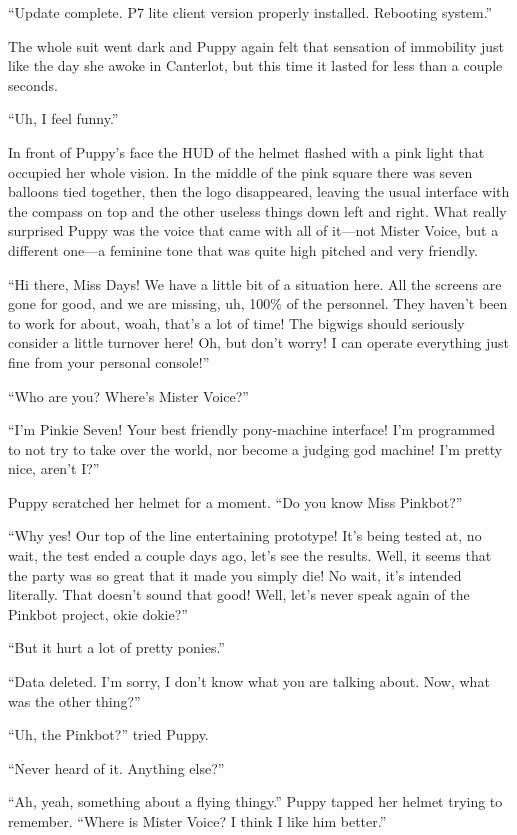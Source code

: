 {\mten ``Update complete. P7 lite client version properly installed. Rebooting system.''}

The whole suit went dark and Puppy again felt that sensation of immobility just like the day she awoke in Canterlot, but this time it lasted for less than a couple seconds.

``Uh, I feel funny.''

In front of Puppy's face the HUD of the helmet flashed with a pink light that occupied her whole vision. In the middle of the pink square there was seven balloons tied together, then the logo disappeared, leaving the usual interface with the compass on top and the other useless things down left and right. What really surprised Puppy was the voice that came with all of it---not Mister Voice, but a different one---a feminine tone that was quite high pitched and very friendly.

``Hi there, Miss Days! We have a little bit of a situation here. All the screens are gone for good, and we are missing, uh, 100\% of the personnel. They haven't been to work for about, woah, that's a lot of time! The bigwigs should seriously consider a little turnover here! Oh, but don't worry! I can operate everything just fine from your personal console!''

``Who are you? Where's Mister Voice?''

``I'm Pinkie Seven! Your best friendly pony-machine interface! I'm programmed to not try to take over the world, nor become a judging god machine! I'm pretty nice, aren't I?''

Puppy scratched her helmet for a moment. ``Do you know Miss Pinkbot?''

``Why yes! Our top of the line entertaining prototype! It's being tested at, no wait, the test ended a couple days ago, let's see the results. Well, it seems that the party was so great that it made you simply die! No wait, it's intended literally. That doesn't sound that good! Well, let's never speak again of the Pinkbot project, okie dokie?''

``But it hurt a lot of pretty ponies.''

``Data deleted. I'm sorry, I don't know what you are talking about. Now, what was the other thing?''

``Uh, the Pinkbot?'' tried Puppy.

``Never heard of it. Anything else?''

``Ah, yeah, something about a flying thingy.'' Puppy tapped her helmet trying to remember. ``Where is Mister Voice? I think I like him better.''

